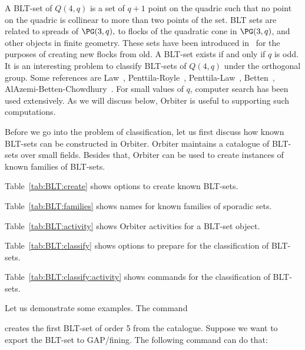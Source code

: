 


A BLT-set of $Q(4,q)$ is a set of $q+1$ point on the quadric 
such that no point on the quadric is collinear to more than two points of the set. 
BLT sets are related to spreads of $\PG(3,q),$ to flocks 
of the quadratic cone in $\PG(3,q)$, 
and other objects in finite geometry.
These sets have been introduced in~\cite{BaderLunardonThas90} 
for the purposes of creating new flocks from old.
A BLT-set exists if and only if $q$ is odd. 
It is an interesting problem to classify BLT-sets of $Q(4,q)$ under the orthogonal group.
Some references are 
Law~\cite{Law03}, Penttila-Royle~\cite{PenttilaRoyle98}, 
Penttila-Law~\cite{LawPenttila03,LawPenttila04}, 
Betten~\cite{Betten13}, 
AlAzemi-Betten-Chowdhury~\cite{AlAzemiBettenChowdhury18}.
For small values of $q$, computer search has been used extensively. 
As we will discuss below, Orbiter is useful to supporting such computations.

\bigskip

Before we go into the problem of classification, let us first discuss how known BLT-sets 
can be constructed in Orbiter. 
Orbiter maintains a catalogue of BLT-sets over small fields. 
Besides that, 
Orbiter can be used to create instances of known families of BLT-sets.


\bigskip

Table~\ref{tab:BLT:create} shows options to create known BLT-sets.

\bigskip

Table~\ref{tab:BLT:families} shows names for known families of sporadic sets.

\bigskip

Table~\ref{tab:BLT:activity} shows Orbiter activities for a BLT-set object.



Table~\ref{tab:BLT:classify} shows options to prepare for the classification of BLT-sets.


Table~\ref{tab:BLT:classify:activity} shows commands for the classification of BLT-sets.



\bigskip


Let us demonstrate some examples. 
The command


creates the first BLT-set of order 5 from the catalogue. 
Suppose we want to export the BLT-set to GAP/fining. 
The following command can do that:

